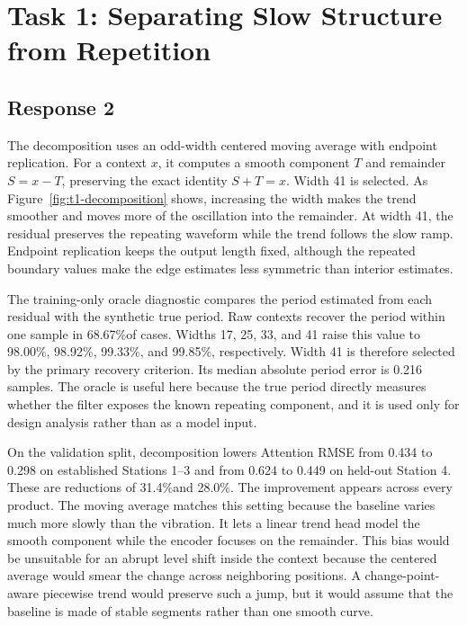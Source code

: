 \documentclass{article}
\newcommand{\pct}{\%}
\begin{document}
\FloatBarrier

\section{Task 1: Separating Slow Structure from Repetition}
\label{sec:t1-decomposition}

\subsection{Response 2}

The decomposition uses an odd-width centered moving average with endpoint replication. For a context $x$, it computes a smooth component $T$ and remainder $S=x-T$, preserving the exact identity $S+T=x$. Width 41 is selected. As Figure~\ref{fig:t1-decomposition} shows, increasing the width makes the trend smoother and moves more of the oscillation into the remainder. At width 41, the residual preserves the repeating waveform while the trend follows the slow ramp. Endpoint replication keeps the output length fixed, although the repeated boundary values make the edge estimates less symmetric than interior estimates.

The training-only oracle diagnostic compares the period estimated from each residual with the synthetic true period. Raw contexts recover the period within one sample in 68.67\pct of cases. Widths 17, 25, 33, and 41 raise this value to 98.00\pct, 98.92\pct, 99.33\pct, and 99.85\pct, respectively. Width 41 is therefore selected by the primary recovery criterion. Its median absolute period error is 0.216 samples. The oracle is useful here because the true period directly measures whether the filter exposes the known repeating component, and it is used only for design analysis rather than as a model input.

On the validation split, decomposition lowers Attention RMSE from 0.434 to 0.298 on established Stations 1--3 and from 0.624 to 0.449 on held-out Station 4. These are reductions of 31.4\pct and 28.0\pct. The improvement appears across every product. The moving average matches this setting because the baseline varies much more slowly than the vibration. It lets a linear trend head model the smooth component while the encoder focuses on the remainder. This bias would be unsuitable for an abrupt level shift inside the context because the centered average would smear the change across neighboring positions. A change-point-aware piecewise trend would preserve such a jump, but it would assume that the baseline is made of stable segments rather than one smooth curve.
\end{document}
